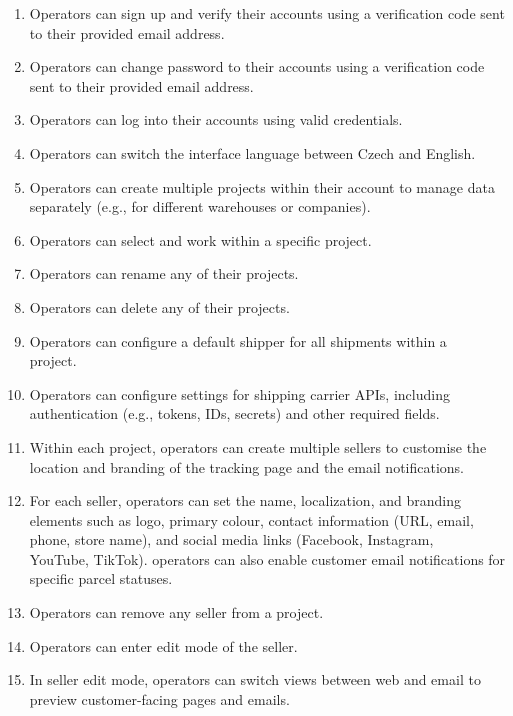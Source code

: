 \begin{enumerate}[label=\bfseries FR\arabic*:,leftmargin=*]
    \item Operators can sign up and verify their accounts using a verification code sent to their provided email address.
    \item Operators can change password to their accounts using a verification code sent to their provided email address.
    \item Operators can log into their accounts using valid credentials.
    \item Operators can switch the interface language between Czech and English.
    \item Operators can create multiple \glspl{project} within their account to manage data separately (e.g., for different warehouses or companies).
    \item Operators can select and work within a specific \gls{project}.
    \item Operators can rename any of their \glspl{project}.
    \item Operators can delete any of their \glspl{project}.
    \item Operators can configure a default shipper for all shipments within a\\ \gls{project}.
    \item Operators can configure settings for shipping carrier APIs, including authentication (e.g., tokens, IDs, secrets) and other required fields.
    \item Within each \gls{project}, operators can create multiple sellers to customise the location and branding of the tracking page and the email notifications.
    \item For each \gls{seller}, operators can set the name, localization, and branding elements such as logo, primary colour, contact information (URL, email, phone, store name), and social media links (Facebook, Instagram,\\ YouTube, TikTok). operators can also enable customer email notifications for specific parcel statuses.
    \item Operators can remove any \gls{seller} from a \gls{project}.
    \item Operators can enter edit mode of the \gls{seller}.
    \item In \gls{seller} edit mode, operators can switch views between web and email to preview customer-facing pages and emails.

\end{enumerate}
